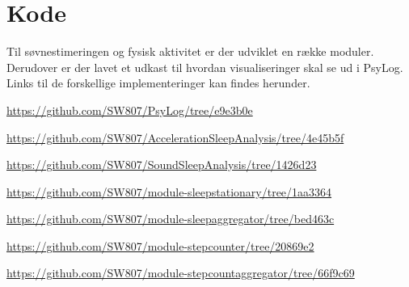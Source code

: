 \chapter{Kode}
Til søvnestimeringen og fysisk aktivitet er der udviklet en række moduler.
Derudover er der lavet et udkast til hvordan visualiseringer skal se ud i PsyLog.
Links til de forskellige implementeringer kan findes herunder.

\begin{description}[style=nextline]
	\item[PsyLog - Viewbranch] \url{https://github.com/SW807/PsyLog/tree/e9e3b0e}
	\item[AccelerationSleepAnalysis] \url{https://github.com/SW807/AccelerationSleepAnalysis/tree/4e45b5f}
	\item[SoundSleepAnalysis] \url{https://github.com/SW807/SoundSleepAnalysis/tree/1426d23}
	\item[module-sleepstationary] \url{https://github.com/SW807/module-sleepstationary/tree/1aa3364}
	\item[module-sleepaggregator] \url{https://github.com/SW807/module-sleepaggregator/tree/bed463c}
	\item[module-stepcounter] \url{https://github.com/SW807/module-stepcounter/tree/20869e2}
	\item[module-stepcountaggregator] \url{https://github.com/SW807/module-stepcountaggregator/tree/66f9c69}
\end{description}